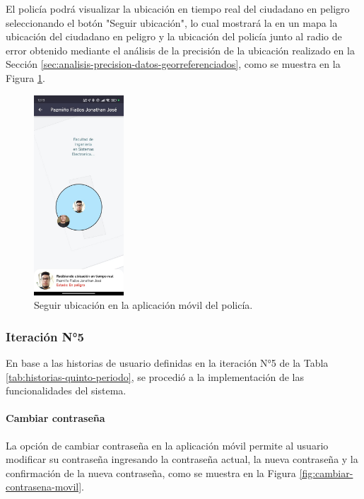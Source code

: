 El policía podrá visualizar la ubicación en tiempo real del ciudadano en peligro seleccionando el botón "Seguir ubicación",
lo cual mostrará la en un mapa la ubicación del ciudadano en peligro y la ubicación del policía junto al radio de error obtenido
mediante el análisis de la precisión de la ubicación realizado en la Sección \ref{sec:analisis-precision-datos-georreferenciados},
como se muestra en la Figura \ref{fig:seguir-ubicacion-movil-policia}.

\begin{figure}[H]
    \centering
    \includegraphics[width=0.3\textwidth]{chapters/III-resultados-y-discusion/resources/images/seguir-ubicacion-policia.png}
    \caption{Seguir ubicación en la aplicación móvil del policía.}
    \label{fig:seguir-ubicacion-movil-policia}
\end{figure}

\subsubsection{Iteración N°5}

En base a las historias de usuario definidas en la iteración N°5 de la Tabla \ref{tab:historias-quinto-periodo}, se procedió a la implementación
de las funcionalidades del sistema.

\paragraph{Cambiar contraseña}
La opción de cambiar contraseña en la aplicación móvil permite al usuario modificar su contraseña ingresando la contraseña actual,
la nueva contraseña y la confirmación de la nueva contraseña, como se muestra en la Figura \ref{fig:cambiar-contrasena-movil}.

